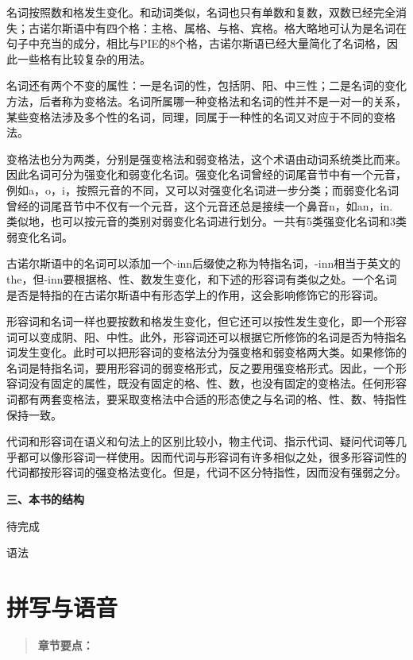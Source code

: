 名词按照数和格发生变化。和动词类似，名词也只有单数和复数，双数已经完全消失；古诺尔斯语中有四个格：主格、属格、与格、宾格。格大略地可认为是名词在句子中充当的成分，相比与PIE的8个格，古诺尔斯语已经大量简化了名词格，因此一些格有比较复杂的用法。

名词还有两个不变的属性：一是名词的性，包括阴、阳、中三性；二是名词的变化方法，后者称为变格法。名词所属哪一种变格法和名词的性并不是一对一的关系，某些变格法涉及多个性的名词，同理，同属于一种性的名词又对应于不同的变格法。

变格法也分为两类，分别是强变格法和弱变格法，这个术语由动词系统类比而来。因此名词可分为强变化和弱变化名词。强变化名词曾经的词尾音节中有一个元音，例如a，o，i，按照元音的不同，又可以对强变化名词进一步分类；而弱变化名词曾经的词尾音节中不仅有一个元音，这个元音还总是接续一个鼻音n，如an，in.
类似地，也可以按元音的类别对弱变化名词进行划分。一共有5类强变化名词和3类弱变化名词。

古诺尔斯语中的名词可以添加一个-inn后缀使之称为特指名词，-inn相当于英文的the，但-inn要根据格、性、数发生变化，和下述的形容词有类似之处。一个名词是否是特指的在古诺尔斯语中有形态学上的作用，这会影响修饰它的形容词。

形容词和名词一样也要按数和格发生变化，但它还可以按性发生变化，即一个形容词可以变成阴、阳、中性。此外，形容词还可以根据它所修饰的名词是否为特指名词发生变化。此时可以把形容词的变格法分为强变格和弱变格两大类。如果修饰的名词是特指名词，要用形容词的弱变格形式，反之要用强变格形式。因此，一个形容词没有固定的属性，既没有固定的格、性、数，也没有固定的变格法。任何形容词都有两套变格法，要采取变格法中合适的形态使之与名词的格、性、数、特指性保持一致。

代词和形容词在语义和句法上的区别比较小，物主代词、指示代词、疑问代词等几乎都可以像形容词一样使用。因而代词与形容词有许多相似之处，很多形容词性的代词都按形容词的强变格法变化。但是，代词不区分特指性，因而没有强弱之分。

\textbf{三、本书的结构}

待完成

语法

\section{拼写与语音}\label{ux62fcux5199ux4e0eux8bedux97f3}

\begin{quote}
\textbf{章节要点：}
\end{quote}

